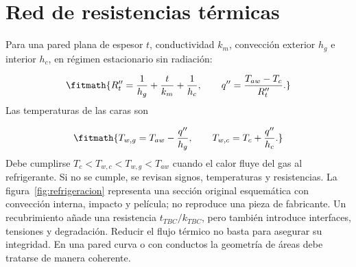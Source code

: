 \documentclass[10pt,openany]{book}
\begin{document}
\section{Red de resistencias térmicas}

Para una pared plana de espesor \(t\), conductividad \(k_m\), convección exterior \(h_g\) e interior \(h_c\), en régimen estacionario sin radiación:

\[
\fitmath{R''_{t}=\frac1{h_g}+\frac{t}{k_m}+\frac1{h_c},\qquad
q''=\frac{T_{aw}-T_c}{R''_{t}}.}
\]
Las temperaturas de las caras son

\[
\fitmath{T_{w,g}=T_{aw}-\frac{q''}{h_g},\qquad
T_{w,c}=T_c+\frac{q''}{h_c}.}
\]
Debe cumplirse \(T_c<T_{w,c}<T_{w,g}<T_{aw}\) cuando el calor fluye del gas al refrigerante. Si no se cumple, se revisan signos, temperaturas y resistencias. La figura~\ref{fig:refrigeracion} representa una sección original esquemática con convección interna, impacto y película; no reproduce una pieza de fabricante.
Un recubrimiento añade una resistencia \(t_{TBC}/k_{TBC}\), pero también introduce interfaces, tensiones y degradación. Reducir el flujo térmico no basta para asegurar su integridad. En una pared curva o con conductos la geometría de áreas debe tratarse de manera coherente.
\end{document}
